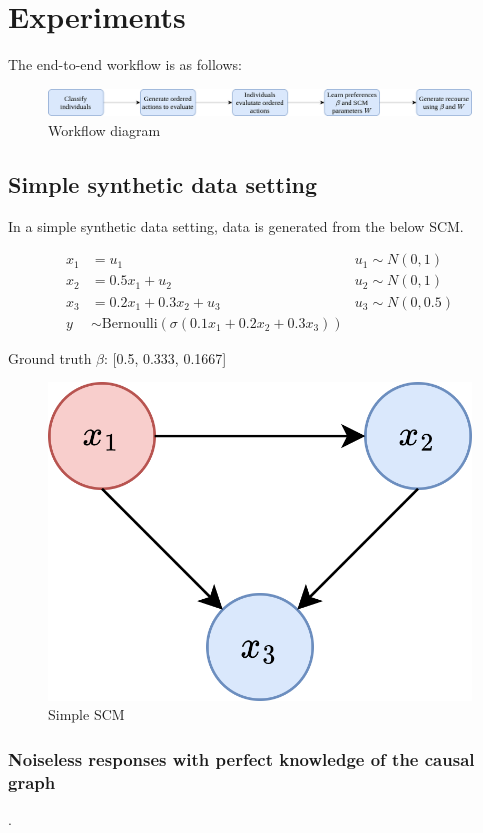 \chapter{Experiments} \label{chapter:experiments}

The end-to-end workflow is as follows:

\begin{figure}[!htb]
	\centering
	\includegraphics[width=\linewidth]{images/draw.io/workflow.png}
	\caption{Workflow diagram}
	\label{fig:workflow}
\end{figure}


\section{Simple synthetic data setting}

In a simple synthetic data setting, data is generated from the below SCM.

\begin{align}
	x_1 & = u_1 & u_1 \sim N(0,1) \\ \nonumber
	x_2 & = 0.5x_1 + u_2 & u_2 \sim N(0,1) \\ \nonumber
	x_3 & = 0.2x_1 + 0.3x_2 + u_3 & u_3 \sim N(0,0.5) \\ \nonumber
	y   & \sim \text{Bernoulli}(\sigma(0.1x_1 + 0.2x_2 + 0.3x_3))
\end{align}

Ground truth $\beta$: [0.5, 0.333, 0.1667]


\begin{figure}[!htb]
	\centering
	\includegraphics[width=0.4\linewidth]{images/draw.io/toy_scm.png}
	\caption{Simple SCM}
	\label{fig:simple_scm}
\end{figure}


\subsection{Noiseless responses with perfect knowledge of the causal graph}.

